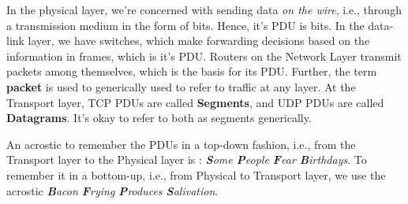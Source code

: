 \noindent
In the physical layer, we're concerned with sending data \textit{on the wire}, i.e., through a transmission medium in the form of bits. Hence, it's PDU is bits. In the data-link layer, we have switches, which make forwarding decisions based on the information in frames, which is it's PDU. Routers on the Network Layer transmit packets among themselves, which is the basis for its PDU. Further, the term \textbf{packet} is used to generically used to refer to traffic at any layer. At the Transport layer, TCP PDUs are called \textbf{Segments}, and UDP PDUs are called \textbf{Datagrams}. It's okay to refer to both as segments generically. 

An acrostic to remember the PDUs in a top-down fashion, i.e., from the Transport layer to the Physical layer is : \textit{\textbf{S}ome \textbf{P}eople \textbf{F}ear \textbf{B}irthdays}. To remember it in a bottom-up, i.e., from Physical to Transport layer, we use the acrostic \textit{\textbf{B}acon \textbf{F}rying \textbf{P}roduces \textbf{S}alivation}.
